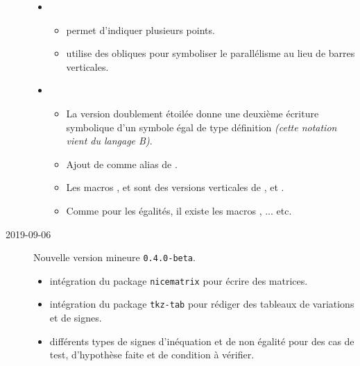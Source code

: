 \documentclass[12pt,a4paper]{article}
\begin{document}
\begin{description}
\begin{itemize}[itemsep=.5em]
    
    
    
        \item {}
        \begin{itemize}[itemsep=.5em]
            \item {} permet d'indiquer plusieurs points.
    
            \item {} utilise des obliques pour symboliser le parallélisme au lieu de barres verticales.
        \end{itemize}
    
    
    
    
        \item {}
        \begin{itemize}[itemsep=.5em]
            \item La version doublement étoilée  donne une deuxième écriture symbolique d'un symbole égal de type définition \emph{(cette notation vient du langage B)}.
    
            \item Ajout de  comme alias de .
    
            \item Les macros ,  et  sont des versions verticales de ,  et .
    
            \item Comme pour les égalités, il existe les macros ,  ... etc.
        \end{itemize}
    \end{itemize}


    \medskip
    \item[2019-09-06] Nouvelle version mineure \verb+0.4.0-beta+.
    
    \begin{itemize}[itemsep=.5em]
        \item {}
              intégration du package \verb+nicematrix+ pour écrire des matrices.
    
    
    
    
        \item {}
              intégration du package \verb+tkz-tab+ pour rédiger des tableaux de variations et de signes.
    
    
    
    
        \item {}
              différents types de signes d'inéquation et de non égalité pour des cas de test, d'hypothèse faite et de condition à vérifier.
    
    \end{itemize}


\end{description}
\end{document}
